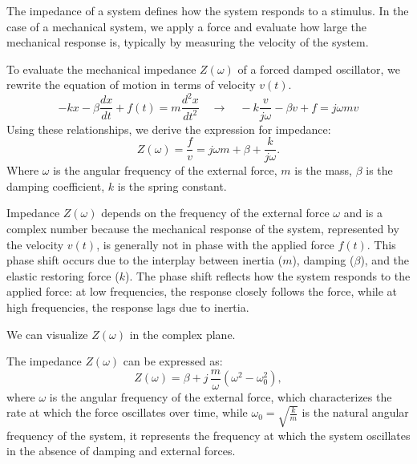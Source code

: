 \documentclass[a4paper]{article}
\begin{document}
The impedance of a system defines how the system responds to a stimulus. In the case of a mechanical system, we apply a force and evaluate how large the mechanical response is, typically by measuring the velocity of the system. 

To evaluate the mechanical impedance \( Z(\omega) \) of a forced damped oscillator, we rewrite the equation of motion in terms of velocity \( v(t) \).
\[
-kx - \beta \frac{dx}{dt} + f(t) = m \frac{d^2x}{dt^2} \quad \to \quad -k\frac{v}{j\omega} - \beta v + f = j\omega mv
\]
Using these relationships, we derive the expression for impedance:
\[
Z(\omega) = \frac{f}{v} = j\omega m + \beta + \frac{k}{j\omega}.
\]
Where \( \omega \) is the angular frequency of the external force, \( m \) is the mass, \( \beta \) is the damping coefficient, \( k \) is the spring constant. 



Impedance \( Z(\omega) \) depends on the frequency of the external force \( \omega \) and is a complex number because the mechanical response of the system, represented by the velocity \( v(t) \), is generally not in phase with the applied force \( f(t) \). This phase shift occurs due to the interplay between inertia (\( m \)), damping (\( \beta \)), and the elastic restoring force (\( k \)). The phase shift reflects how the system responds to the applied force: at low frequencies, the response closely follows the force, while at high frequencies, the response lags due to inertia.


We can visualize \( Z(\omega) \) in the complex plane.












The impedance \( Z(\omega) \) can be expressed as:
\[
Z(\omega) = \beta + j \, \frac{m}{\omega} (\omega^2 - \omega_0^2),
\]
where \( \omega \) is the angular frequency of the external force, which characterizes the rate at which the force oscillates over time, while \( \omega_0 = \sqrt{\frac{k}{m}} \) is the natural angular frequency of the system, it represents the frequency at which the system oscillates in the absence of damping and external forces.
\end{document}

